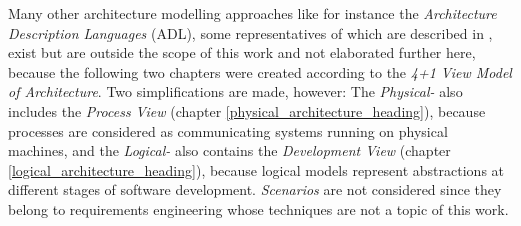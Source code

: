 Many other architecture modelling approaches like for instance the
\emph{Architecture Description Languages} (ADL), some representatives of which
are described in \cite{garlan, clements}, exist but are outside the scope of
this work and not elaborated further here, because the following two chapters
were created according to the \emph{4+1 View Model of Architecture}. Two
simplifications are made, however: The \emph{Physical-} also includes the
\emph{Process View} (chapter \ref{physical_architecture_heading}), because
processes are considered as communicating systems running on physical machines,
and the \emph{Logical-} also contains the \emph{Development View} (chapter
\ref{logical_architecture_heading}), because logical models represent
abstractions at different stages of software development. \emph{Scenarios} are
not considered since they belong to requirements engineering whose techniques
are not a topic of this work.

